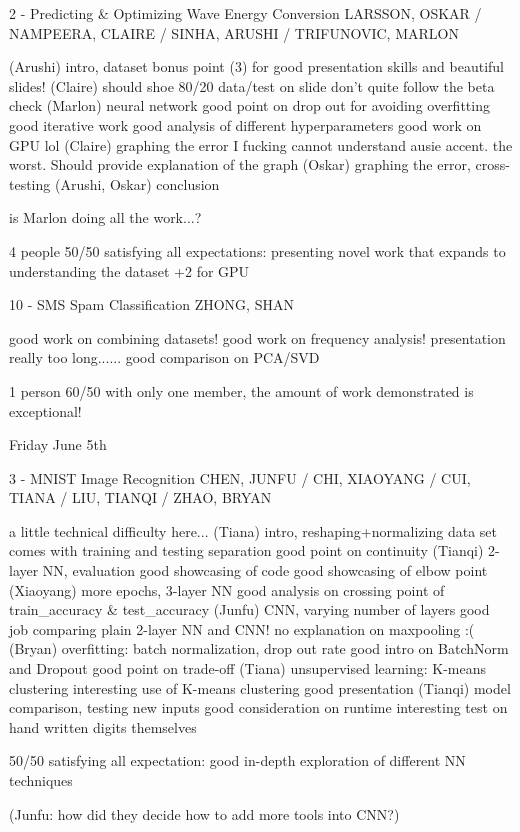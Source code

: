 2 - Predicting & Optimizing Wave Energy Conversion
LARSSON, OSKAR / NAMPEERA, CLAIRE / SINHA, ARUSHI / TRIFUNOVIC, MARLON

(Arushi) intro, dataset
bonus point (3) for good presentation skills and beautiful slides!
(Claire)
should shoe 80/20 data/test on slide
don't quite follow the beta check
(Marlon) neural network
good point on drop out for avoiding overfitting
good iterative work
good analysis of different hyperparameters
good work on GPU lol
(Claire) graphing the error
I fucking cannot understand ausie accent. the worst.
Should provide explanation of the graph
(Oskar) graphing the error, cross-testing
(Arushi, Oskar) conclusion

is Marlon doing all the work...?

4 people
50/50 satisfying all expectations: presenting novel work that expands to understanding the dataset
+2 for GPU

10 - SMS Spam Classification
ZHONG, SHAN

good work on combining datasets!
good work on frequency analysis!
presentation really too long......
good comparison on PCA/SVD

1 person
60/50 with only one member, the amount of work demonstrated is exceptional!


Friday June 5th

3 - MNIST Image Recognition
CHEN, JUNFU / CHI, XIAOYANG / CUI, TIANA / LIU, TIANQI / ZHAO, BRYAN

a little technical difficulty here...
(Tiana) intro, reshaping+normalizing
data set comes with training and testing separation
good point on continuity
(Tianqi) 2-layer NN, evaluation
good showcasing of code
good showcasing of elbow point
(Xiaoyang) more epochs, 3-layer NN
good analysis on crossing point of train_accuracy & test_accuracy
(Junfu) CNN, varying number of layers
good job comparing plain 2-layer NN and CNN!
no explanation on maxpooling :(
(Bryan) overfitting: batch normalization, drop out rate
good intro on BatchNorm and Dropout
good point on trade-off
(Tiana) unsupervised learning: K-means clustering
interesting use of K-means clustering
good presentation
(Tianqi) model comparison, testing new inputs
good consideration on runtime
interesting test on hand written digits themselves

50/50 satisfying all expectation: good in-depth exploration of different NN techniques

(Junfu: how did they decide how to add more tools into CNN?)


